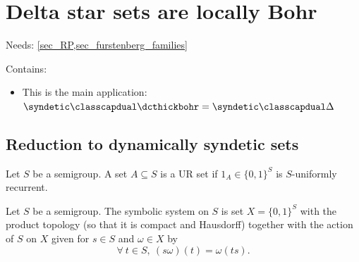 \section{Delta star sets are locally Bohr}
\label{sec_delta_star_locally_bohr}

Needs: \cref{sec_RP,sec_furstenberg_families}

Contains:
\begin{itemize}
    \item This is the main application: $\syndetic \classcapdual \dcthickbohr = \syndetic \classcapdual \Delta$
\end{itemize}


\subsection{Reduction to dynamically syndetic sets}



\begin{definition}
    \label{def_ur_set}
    \leanok{}
    Let $S$ be a semigroup.  A set $A \subseteq S$ is a UR set if $1_A \in \{0,1\}^S$ is $S$-uniformly recurrent.
\end{definition}

\begin{definition}
\label{def_symbolic_system}
\leanok{}
    Let $S$ be a semigroup.  The symbolic system on $S$ is set $X = \{0,1\}^S$ with the product topology (so that it is compact and Hausdorff) together with the action of $S$ on $X$ given for $s \in S$ and $\omega \in X$ by
    \[\forall \ t \in S, \ (s \omega)(t) = \omega(ts).\]
\end{definition}


